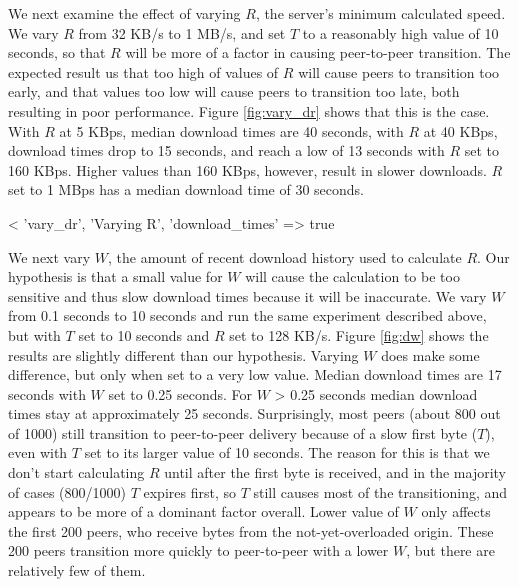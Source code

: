 We next examine the effect of varying $R$, the server's minimum calculated speed.  We vary $R$ from 32 KB/s to 1 MB/s, and set $T$ to a 
reasonably high value of 10 seconds, so that $R$ will be more of a factor in causing peer-to-peer transition. 
The expected result us that too high of values of $R$ will cause peers to transition 
too early, and that values too low will cause peers to transition too late, both resulting in poor performance. Figure \ref{fig:vary_dr} shows that this is the case.
With $R$ at 5 KBps, median download times are 40 seconds, with $R$ at 40 KBps, download times drop to 15 seconds, and reach
a low of 13 seconds with $R$ set to 160 KBps. Higher values than 160 KBps, however, result in slower downloads.  $R$ set to 1 MBps has a median download time of 30 seconds. 

<%
  'vary_dr', 'Varying R', 'download_times' => true %

We next vary $W$, the amount of recent download history used to calculate $R$. Our hypothesis is that 
a small value for $W$ will cause the calculation to be too sensitive and thus slow download times because it will be inaccurate. 
We vary $W$ from 0.1 seconds 
to 10 seconds and run the same experiment described above, but with $T$ set to 10 seconds and $R$ set to 128 KB/s. Figure \ref{fig:dw} shows the results are 
slightly different than our hypothesis. Varying $W$ does make some difference, but only when set 
to a very low value. Median download times are 17 seconds with $W$ set to 0.25 seconds. For $W$ \textgreater{} 0.25 seconds
median download times stay at approximately 25 seconds. Surprisingly, 
most peers (about 800 out of 1000) still transition to peer-to-peer delivery because of 
a slow first byte ($T$), even with $T$ set to its larger value of 10 seconds. 
The reason for this is that we don't start calculating $R$ until after the first byte is received, and 
in the majority of cases (800/1000) $T$ expires first, so $T$ still 
causes most of the transitioning, and appears to be more of a dominant factor overall.  Lower value of $W$ only affects the first 
200 peers, who receive bytes from the not-yet-overloaded origin.  
These 200 peers transition more quickly to peer-to-peer with a lower $W$, but there are relatively few of them.



